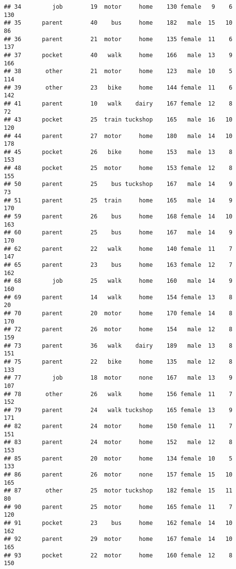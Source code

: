 \documentclass[
]{article}
\begin{document}
\begin{verbatim}
## 34         job        19  motor     home    130 female   9    6     130
## 35      parent        40    bus     home    182   male  15   10      86
## 36      parent        21  motor     home    135 female  11    6     137
## 37      pocket        40   walk     home    166   male  13    9     166
## 38       other        21  motor     home    123   male  10    5     114
## 39       other        23   bike     home    144 female  11    6     142
## 41      parent        10   walk    dairy    167 female  12    8      72
## 43      pocket        25  train tuckshop    165   male  16   10     120
## 44      parent        27  motor     home    180   male  14   10     178
## 45      pocket        26   bike     home    153   male  13    8     153
## 48      pocket        25  motor     home    153 female  12    8     155
## 50      parent        25    bus tuckshop    167   male  14    9      73
## 51      parent        25  train     home    165   male  14    9     170
## 59      parent        26    bus     home    168 female  14   10     163
## 60      parent        25    bus     home    167   male  14    9     170
## 62      parent        22   walk     home    140 female  11    7     147
## 65      parent        23    bus     home    163 female  12    7     162
## 68         job        25   walk     home    160   male  14    9     160
## 69      parent        14   walk     home    154 female  13    8      20
## 70      parent        20  motor     home    170 female  14    8     170
## 72      parent        26  motor     home    154   male  12    8     159
## 73      parent        36   walk    dairy    189   male  13    8     151
## 75      parent        22   bike     home    135   male  12    8     133
## 77         job        18  motor     none    167   male  13    9     107
## 78       other        26   walk     home    156 female  11    7     152
## 79      parent        24   walk tuckshop    165 female  13    9     171
## 82      parent        24  motor     home    150 female  11    7     151
## 83      parent        24  motor     home    152   male  12    8     153
## 85      parent        20  motor     home    134 female  10    5     133
## 86      parent        26  motor     none    157 female  15   10     165
## 87       other        25  motor tuckshop    182 female  15   11      80
## 90      parent        25  motor     home    165 female  11    7     120
## 91      pocket        23    bus     home    162 female  14   10     162
## 92      parent        29  motor     home    167 female  14   10     165
## 93      pocket        22  motor     home    160 female  12    8     150

\end{verbatim}
\end{document}
